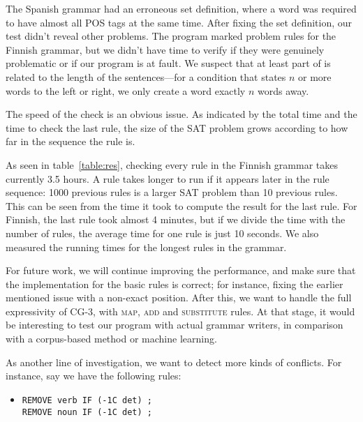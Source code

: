 The Spanish grammar had an erroneous set definition, where a word was required to have almost all POS tags at the same time. After fixing the set definition, our test didn't reveal other problems.
The program marked  problem rules for the Finnish grammar, but we didn't have time to verify if they were genuinely problematic or if our program is at fault.
We suspect that at least part of is related to the length of the sentences---for a condition that states $n$ or more words to the left or right, we only create a word exactly $n$ words away.

The speed of the check is an obvious issue.
As indicated by the total time and the time to check the last rule, the size of the SAT problem grows according to how far in the sequence the rule is.

As seen in table~\ref{table:res}, checking every rule in the Finnish grammar takes currently 3.5 hours.
A rule takes longer to run if it appears later in the rule sequence: 1000 previous rules is a larger SAT problem than 10 previous rules.
This can be seen from the time it took to compute the result for the last rule. For Finnish, the last rule took almost 4 minutes, but if we divide the time with the number of rules, the average time for one rule is just 10 seconds.
We also measured the running times for the longest rules in the grammar.


For future work, we will continue improving the performance, and make sure that the implementation for the basic rules is correct; for instance, fixing the earlier mentioned issue with a non-exact position.
After this, we want to handle the full expressivity of CG-3, with \textsc{map}, \textsc{add} and \textsc{substitute} rules.
At that stage, it would be interesting to test our program with actual grammar writers,
in comparison with a corpus-based method or machine learning.

As another line of investigation, we want to detect more kinds of conflicts.
For instance, say we have the following rules:

\begin{itemize}
\item[] \begin{verbatim}
REMOVE verb IF (-1C det) ;
REMOVE noun IF (-1C det) ;
\end{verbatim}
\end{itemize}

